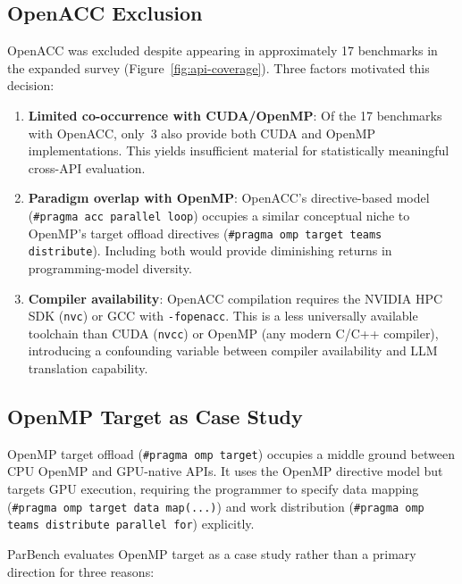 \subsection{OpenACC Exclusion}
\label{sec:appendix-a4}

OpenACC was excluded despite appearing in approximately 17 benchmarks in the
expanded survey (Figure~\ref{fig:api-coverage}). Three factors motivated this
decision:

\begin{enumerate}
  \item \textbf{Limited co-occurrence with CUDA/OpenMP}: Of the 17 benchmarks
    with OpenACC, only~3 also provide both CUDA and OpenMP implementations. This
    yields insufficient material for statistically meaningful cross-API
    evaluation.

  \item \textbf{Paradigm overlap with OpenMP}: OpenACC's directive-based model
    (\texttt{\#pragma acc parallel loop}) occupies a similar conceptual niche to
    OpenMP's target offload directives (\texttt{\#pragma omp target teams
    distribute}). Including both would provide diminishing returns in
    programming-model diversity.

  \item \textbf{Compiler availability}: OpenACC compilation requires the NVIDIA
    HPC SDK (\texttt{nvc}) or GCC with \texttt{-fopenacc}. This is a less
    universally available toolchain than CUDA (\texttt{nvcc}) or OpenMP (any
    modern C/C++ compiler), introducing a confounding variable between compiler
    availability and LLM translation capability.
\end{enumerate}

\subsection{OpenMP Target as Case Study}
\label{sec:appendix-a5}

OpenMP target offload (\texttt{\#pragma omp target}) occupies a middle ground
between CPU OpenMP and GPU-native APIs. It uses the OpenMP directive model but
targets GPU execution, requiring the programmer to specify data mapping
(\texttt{\#pragma omp target data map(...)}) and work distribution
(\texttt{\#pragma omp teams distribute parallel for}) explicitly.

ParBench evaluates OpenMP target as a case study rather than a primary direction
for three reasons:

